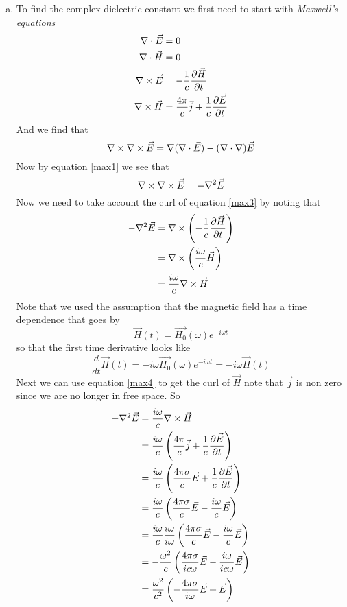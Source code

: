 \documentclass[11pt]{article}
\numberwithin{equation}{section}
\begin{document}
\begin{enumerate}[(a)]
\item
To find the complex dielectric constant we first need to start with \emph{Maxwell's equations}
\begin{align}
\label{max1}
\bold\nabla\cdot\vec{E} &= 0\\
\label{max2}
\bold\nabla\cdot\vec{H} &= 0\\
\label{max3}
\bold\nabla\times\vec{E} &= -\frac{1}{c}\frac{\partial \vec{H}}{\partial t}\\
\label{max4}
\bold\nabla\times\vec{H} &= \frac{4\pi}{c}\vec{j}+\frac{1}{c}\frac{\partial\vec{E}}{\partial t}
\end{align}
And we find that
$$\bold\nabla\times\bold\nabla\times\vec{E} = \bold\nabla(\bold\nabla\cdot\vec{E}) - (\bold\nabla\cdot\bold\nabla)\vec{E}$$
Now by equation \ref{max1} we see that
$$\bold\nabla\times\bold\nabla\times\vec{E} = -\bold\nabla^2\vec{E}$$
Now we need to take account the curl of equation \ref{max3} by noting that
\begin{align*}
-\bold\nabla^2\vec{E} &= \bold\nabla\times\left(-\frac{1}{c}\frac{\partial \vec{H}}{\partial t}\right)\\
&= \bold\nabla\times\left(\frac{i\omega}{c}\vec{H}\right)\\
&= \frac{i\omega}{c}\bold\nabla\times\vec{H}
\end{align*}
Note that we used the assumption that the magnetic field has a time dependence that goes by
$$\vec{H}(t) = \vec{H_0}(\omega)e^{-i\omega t}$$
so that the first time derivative looks like
$$\frac{d}{dt}\vec{H}(t) = -i\omega\vec{H_0}(\omega)e^{-i\omega t} = -i\omega \vec{H}(t)$$
Next we can use equation \ref{max4} to get the curl of $\vec{H}$ note that $\vec{j}$ is non zero since we are no longer in free space. So
\begin{align*}
-\grad^2\vec{E} &= \frac{i\omega}{c}\grad\times\vec{H}\\
&= \frac{i\omega}{c}\left(\frac{4\pi}{c}\vec{j}+\frac{1}{c}\frac{\partial\vec{E}}{\partial t}\right)\\
&= \frac{i\omega}{c}\left(\frac{4\pi\sigma}{c}\vec{E}+\frac{1}{c}\frac{\partial\vec{E}}{\partial t}\right)\\
&= \frac{i\omega}{c}\left(\frac{4\pi\sigma}{c}\vec{E} - \frac{i\omega}{c}\vec{E}\right)\\
&= \frac{i\omega}{c}\frac{i\omega}{i\omega}\left(\frac{4\pi\sigma}{c}\vec{E} - \frac{i\omega}{c}\vec{E}\right)\\
&= -\frac{\omega^2}{c}\left(\frac{4\pi\sigma}{ic\omega}\vec{E} - \frac{i\omega}{ic\omega}\vec{E}\right)\\
&= \frac{\omega^2}{c^2}\left(-\frac{4\pi\sigma}{i\omega}\vec{E} + \vec{E}\right)\\

\end{align*}
\end{enumerate}
\end{document}
